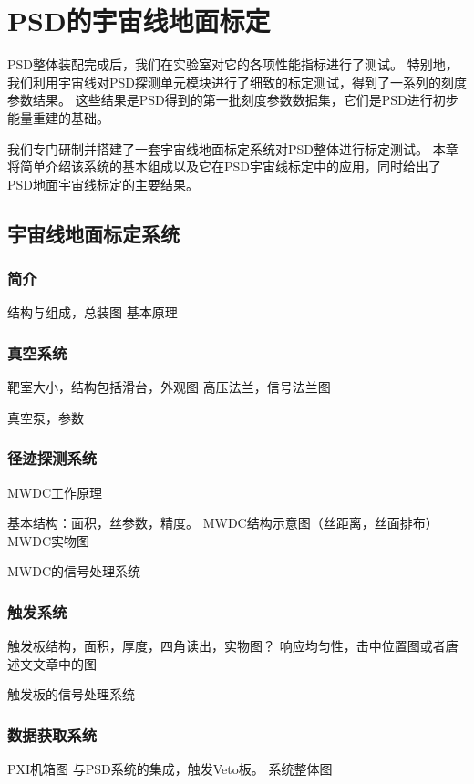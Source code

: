 \chapter{PSD的宇宙线地面标定}
\label{ch:cosmicray_calibration}
PSD整体装配完成后，我们在实验室对它的各项性能指标进行了测试。
特别地，我们利用宇宙线对PSD探测单元模块进行了细致的标定测试，得到了一系列的刻度参数结果。
这些结果是PSD得到的第一批刻度参数数据集，它们是PSD进行初步能量重建的基础。

我们专门研制并搭建了一套宇宙线地面标定系统对PSD整体进行标定测试。
本章将简单介绍该系统的基本组成以及它在PSD宇宙线标定中的应用，同时给出了PSD地面宇宙线标定的主要结果。

\section{宇宙线地面标定系统}
\subsection{简介}
结构与组成，总装图
基本原理

\subsection{真空系统}
靶室大小，结构包括滑台，外观图
高压法兰，信号法兰图

真空泵，参数

\subsection{径迹探测系统}
MWDC工作原理

基本结构：面积，丝参数，精度。
MWDC结构示意图（丝距离，丝面排布）
MWDC实物图

MWDC的信号处理系统

\subsection{触发系统}
触发板结构，面积，厚度，四角读出，实物图？
响应均匀性，击中位置图或者唐述文文章中的图

触发板的信号处理系统

\subsection{数据获取系统}
PXI机箱图
与PSD系统的集成，触发Veto板。
系统整体图

